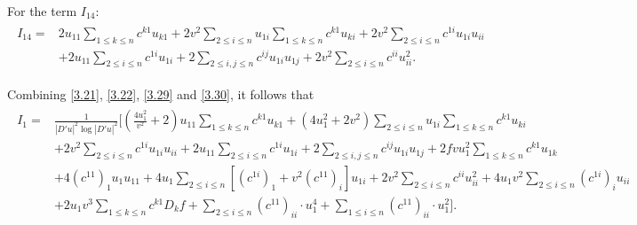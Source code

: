 \documentclass[11pt]{amsart}
\numberwithin{equation}{section}
\begin{document}
For the term $I_{14}$:
\begin{align}\label{3.30}
\begin{split}
I_{14}
=&2u_{11}\sum_{1\leq k\leq n}c^{k1}u_{k1}+2v^2\sum_{2\leq i\leq n}u_{1i}\sum_{1\leq k\leq n}c^{k1}u_{ki}+2v^2\sum_{2\leq i\leq n}c^{1i}u_{1i}u_{ii}
\\
&+2u_{11}\sum_{2\leq i\leq n}c^{1i}u_{1i}+2\sum_{2\leq i,j\leq n}c^{ij}u_{1i}u_{1j}+2v^2\sum_{2\leq i\leq n}c^{ii}u_{ii}^2.
\end{split}
\end{align}

Combining  \eqref{3.21}, \eqref{3.22}, \eqref{3.29} and \eqref{3.30}, it follows that
\begin{align}\label{3.31}
\begin{split}
I_1=&\frac{1}{|D'u|^2\log|D'u|^2}\bigg[(\frac{4 u_1^2}{v^2}+2)u_{11}\sum_{1\leq k\leq n}c^{k1}u_{k1}+(4u_1^2+2v^2)\sum_{2\leq i\leq n}u_{1i}\sum_{1\leq k\leq n}c^{k1}u_{ki}\\
&+2v^2\sum_{2\leq i\leq n}c^{1i}u_{1i}u_{ii}
+2u_{11}\sum_{2\leq i\leq n}c^{1i}u_{1i}+2\sum_{2\leq i,j\leq n}c^{ij}u_{1i}u_{1j}
+2fvu_1^2\sum_{1\leq k\leq n}c^{k1}u_{1k}\\
&+4(c^{11})_{1} u_1u_{11}+4 u_1\sum_{2\leq i\leq n}[(c^{1i})_{1}+v^2(c^{11})_{i}]u_{1i}+2v^2\sum_{2\leq i\leq n}c^{ii}u_{ii}^2+4u_1v^2\sum_{2\leq i\leq n}(c^{1i})_{i}u_{ii}\\
&+2u_1v^3\sum_{1\leq k\leq n}c^{k1}D_{k}f+\sum_{2\leq i\leq n}(c^{11})_{ii}\cdot u^4_1+\sum_{1\leq i\leq n}(c^{11})_{ii}\cdot u^2_1\bigg].
\end{split}
\end{align}
\end{document}
